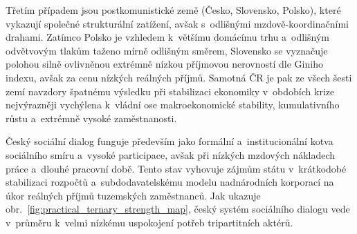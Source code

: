 

Třetím případem jsou postkomunistické země (Česko, Slovensko, Polsko), které vykazují společné strukturální zatížení, avšak s~odlišnými mzdově-koordinačními drahami. Zatímco Polsko je vzhledem k~většímu domácímu trhu a~odlišným odvětvovým tlakům taženo mírně odlišným směrem, Slovensko se vyznačuje polohou silně ovlivněnou extrémně nízkou příjmovou nerovností dle Giniho indexu, avšak za cenu nízkých reálných příjmů. Samotná \ac{ČR} je pak ze všech šesti zemí navzdory špatnému výsledku při stabilizaci ekonomiky v~obdobích krize nejvýrazněji vychýlena k~vládní ose makroekonomické stability, kumulativního růstu  a~extrémně vysoké zaměstnanosti.\par

Český sociální dialog funguje především jako formální a~institucionální kotva sociálního smíru a~vysoké participace, avšak při nízkých mzdových nákladech práce a~dlouhé pracovní době. Tento stav vyhovuje zájmům státu v~krátkodobé stabilizaci rozpočtů a~subdodavatelskému modelu nadnárodních korporací na úkor reálných příjmů tuzemských zaměstnanců. Jak ukazuje obr.~\ref{fig:practical_ternary_strength_map}, český systém sociálního dialogu vede v~průměru k~velmi nízkému uspokojení potřeb tripartitních aktérů.\par


